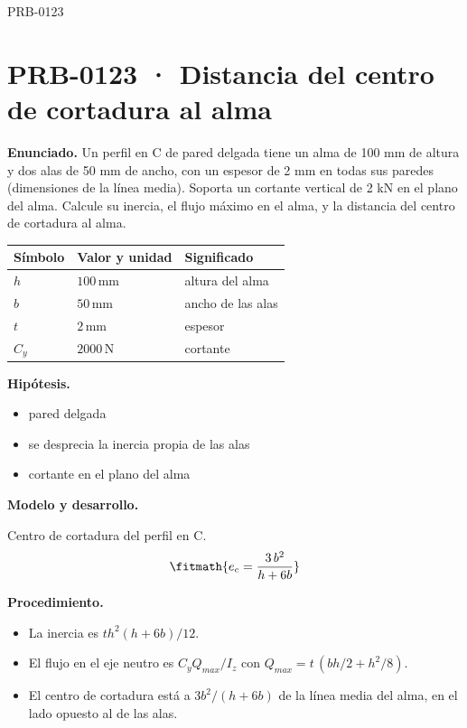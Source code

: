 \begin{studiumworked}{PRB-0123}

\section{PRB-0123 · Distancia del centro de cortadura al alma}

\textbf{Enunciado.} Un perfil en C de pared delgada tiene un alma de 100 mm de altura y dos alas de 50 mm de ancho, con un espesor de 2 mm en todas sus paredes (dimensiones de la línea media). Soporta un cortante vertical de 2 kN en el plano del alma. Calcule su inercia, el flujo máximo en el alma, y la distancia del centro de cortadura al alma.

\par\medskip\noindent\begin{tabular}{@{}p{.18\linewidth}p{.26\linewidth}p{.48\linewidth}@{}}
\toprule Símbolo & Valor y unidad & Significado\\\midrule
$h$ & $100\,\mathrm{mm}$ & altura del alma\\
$b$ & $50\,\mathrm{mm}$ & ancho de las alas\\
$t$ & $2\,\mathrm{mm}$ & espesor\\
$C_{y}$ & $2000\,\mathrm{N}$ & cortante\\
\bottomrule\end{tabular}\par\medskip

\textbf{Hipótesis.}\begin{itemize}\item pared delgada
\item se desprecia la inercia propia de las alas
\item cortante en el plano del alma\end{itemize}

\textbf{Modelo y desarrollo.}

Centro de cortadura del perfil en C.\[\fitmath{e_c = \frac{3\,b^{2}}{h + 6b}}\]

\textbf{Procedimiento.}\begin{itemize}\item La inercia es $t h^2 (h + 6b)/12$.
\item El flujo en el eje neutro es $C_y Q_{max}/I_z$ con $Q_{max} = t\,(b h/2 + h^2/8)$.
\item El centro de cortadura está a $3b^2/(h + 6b)$ de la línea media del alma, en el lado opuesto al de las alas.\end{itemize}


\end{studiumworked}
